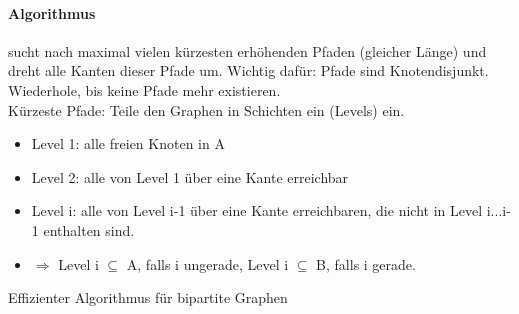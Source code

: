 \paragraph{Algorithmus} sucht nach maximal vielen kürzesten erhöhenden Pfaden (gleicher Länge) und dreht alle Kanten dieser Pfade um. Wichtig dafür: Pfade sind Knotendisjunkt. Wiederhole, bis keine Pfade mehr existieren. \\

Kürzeste Pfade: Teile den Graphen in Schichten ein (Levels) ein.
\begin{itemize}
    \item[] Level 1: alle freien Knoten in A
    \item[] Level 2: alle von Level 1 über eine Kante erreichbar
    \item[] Level i: alle von Level i-1 über eine Kante erreichbaren, die nicht in Level i...i-1 enthalten sind.
    \item[] $ \Rightarrow $ Level i $ \subseteq $ A, falls i ungerade, Level i $ \subseteq $ B, falls i gerade.
\end{itemize}

\begin{algorithm}[H]
\SetAlgoLined

\caption{Effizienter Algorithmus für bipartite Graphen}
\end{algorithm}



 
